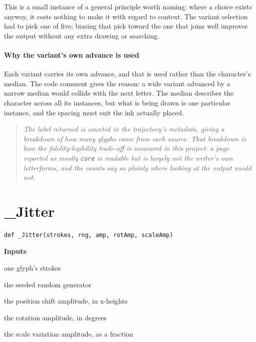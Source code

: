 This is a small instance of a general principle worth naming: where a choice exists anyway, it costs nothing to make it with regard to context. The variant selection had to pick one of five; biasing that pick toward the one that joins well improves the output without any extra drawing or searching.


\paragraph{Why the variant's own advance is used}
Each variant carries its own advance, and that is used rather than the character's median. The code comment gives the reason: a wide variant advanced by a narrow median would collide with the next letter. The median describes the character across all its instances, but what is being drawn is one particular instance, and the spacing must suit the ink actually placed.


\begin{quote}\small\itshape The label returned is counted in the trajectory's metadata, giving a breakdown of how many glyphs came from each source. That breakdown is how the fidelity-legibility trade-off is measured in this project: a page reported as mostly \texttt{core} is readable but is largely not the writer's own letterforms, and the counts say so plainly where looking at the output would not.\end{quote}

\section{\_Jitter}
\begin{lstlisting}[style=sig]
def _Jitter(strokes, rng, amp, rotAmp, scaleAmp)
\end{lstlisting}

\noindent\textbf{Inputs}
\begin{description}[leftmargin=2.2em,style=nextline,font=\normalfont\ttfamily]\setlength\itemsep{1pt}
  \item[{strokes}] \normalfont one glyph's strokes
  \item[{rng}] \normalfont the seeded random generator
  \item[{amp}] \normalfont the position shift amplitude, in x-heights
  \item[{rotAmp}] \normalfont the rotation amplitude, in degrees
  \item[{scaleAmp}] \normalfont the scale variation amplitude, as a fraction
\end{description}

